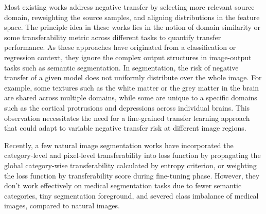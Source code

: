 Most existing works address negative transfer by selecting more relevant source domain\cite{yicong, jin2024cross}, reweighting the source samples\cite{instance_level_3, negative_transfer_2}, and aligning distributions in the feature space\cite{feature_level_1}. The principle idea in these works lies in the notion of domain similarity \cite{MMD, KLD, correlation_coefficient} or some transferability metric across different tasks \cite{nce, hscore, leep, logme, otce} to quantify transfer performance.  
As these approaches have originated from a classification or regression context, they ignore the complex output structures in image-output tasks such as semantic segmentation. In segmentation, the risk of negative transfer of a given model does not uniformly distribute over the whole image. For example, some textures such as the white matter or the grey matter in the brain are shared across multiple domains, while some are unique to a specific domains such as the cortical protrusions and depressions across individual brains. This observation necessitates the need for a fine-grained transfer learning approach that could adapt to variable negative transfer risk at different image regions.


Recently, a few natural image segmentation works have incorporated the category-level and pixel-level transferability into loss function %
by propagating the global category-wise transferability calculated by entropy criterion\cite{dong}, or weighting the loss function by transferability score during fine-tuning phase\cite{10222912}. However, they don't work effectively on medical segmentation tasks due to fewer semantic categories, tiny segmentation foreground, and severed class imbalance of medical images, compared to natural images\cite{medical_and_natural}.




